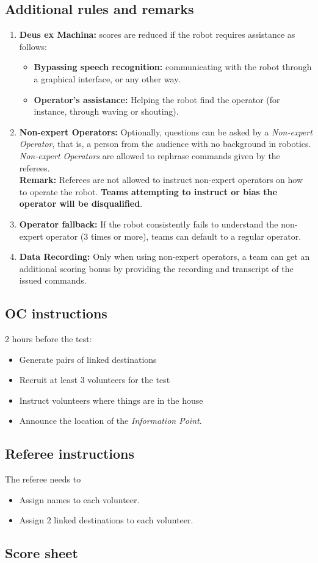 \subsection*{Additional rules and remarks}
\begin{enumerate}[nosep]
	\item \textbf{Deus ex Machina:} scores are reduced if the robot requires assistance as follows:
	\begin{itemize}[nosep]
		\item \textbf{Bypassing speech recognition:} communicating with the robot through a graphical interface, or any other way.
		
		\item \textbf{Operator's assistance:} Helping the robot find the operator (for instance, through waving or shouting).
	\end{itemize}

	\item \textbf{Non-expert Operators:} Optionally, questions can be asked by a \emph{Non-expert Operator}, that is, a person from the audience with no background in robotics. \emph{Non-expert Operators} are allowed to rephrase commands given by the referees.
	\\\textbf{Remark:} Referees are not allowed to instruct non-expert operators on how to operate the robot. \textbf{Teams attempting to instruct or bias the operator will be disqualified}.

	\item \textbf{Operator fallback:} If the robot consistently fails to understand the non-expert operator (3 times or more), teams can default to a regular operator.
	
	\item \textbf{Data Recording:} Only when using non-expert operators, a team can get an additional scoring bonus by providing the recording and transcript of the issued commands.

\end{enumerate}

\subsection*{OC instructions}
2 hours before the test:
\begin{itemize}
	\item Generate pairs of linked destinations
	\item Recruit at least 3 volunteers for the test
	\item Instruct volunteers where things are in the house
	\item Announce the location of the \emph{Information Point}.
\end{itemize}

\subsection*{Referee instructions}
The referee needs to
\begin{itemize}
	\item Assign names to each volunteer.
	\item Assign 2 linked destinations to each volunteer.
\end{itemize}

\subsection*{Score sheet}

